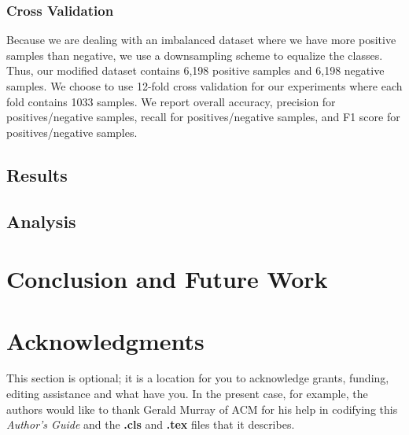 \documentclass{acm_proc_article-sp}
\begin{document}
\subsubsection{Cross Validation}
Because we are dealing with an imbalanced dataset where we have more positive samples than negative, we use a downsampling scheme to equalize the classes. Thus, our modified dataset contains 6,198 positive samples and 6,198 negative samples. We choose to use 12-fold cross validation for our experiments where each fold contains 1033 samples.
We report overall accuracy, precision for positives/negative samples, recall for positives/negative samples, and F1 score for positives/negative samples. 

\subsection{Results}

\subsection{Analysis}

\section{Conclusion and Future Work}
\section{Acknowledgments}
This section is optional; it is a location for you
to acknowledge grants, funding, editing assistance and
what have you.  In the present case, for example, the
authors would like to thank Gerald Murray of ACM for
his help in codifying this \textit{Author's Guide}
and the \textbf{.cls} and \textbf{.tex} files that it describes.

%

%
%

\end{document}
